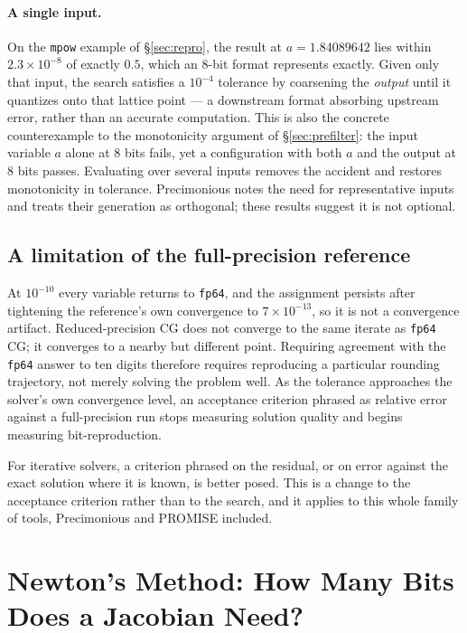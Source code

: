 \documentclass[11pt]{article}
\begin{document}
\paragraph{A single input.} On the \texttt{mpow} example of \S\ref{sec:repro},
the result at $a = 1.84089642$ lies within $2.3 \times 10^{-8}$ of exactly
$0.5$, which an 8-bit format represents exactly. Given only that input, the
search satisfies a $10^{-4}$ tolerance by coarsening the \emph{output} until it
quantizes onto that lattice point --- a downstream format absorbing upstream error,
rather than an accurate computation. This is also the concrete counterexample to
the monotonicity argument of \S\ref{sec:prefilter}: the input variable $a$ alone
at 8 bits fails, yet a configuration with both $a$ and the output at 8 bits
passes. Evaluating over
several inputs removes the accident and restores monotonicity in tolerance.
Precimonious notes the need for representative inputs and treats their generation
as orthogonal; these results suggest it is not optional.

\subsection{A limitation of the full-precision reference}
\label{sec:criterion}

At $10^{-10}$ every variable returns to \texttt{fp64}, and the assignment
persists after
tightening the reference's own convergence to $7 \times 10^{-13}$, so it is not a
convergence artifact. Reduced-precision CG does not converge to the same iterate
as \texttt{fp64} CG; it converges to a nearby but different point. Requiring
agreement with the \texttt{fp64} answer to ten digits therefore requires
reproducing a particular rounding trajectory, not merely solving the problem
well. As the tolerance approaches the solver's own convergence level, an
acceptance criterion phrased as relative error against a full-precision run stops
measuring solution quality and begins measuring bit-reproduction.

For iterative solvers, a criterion phrased on the residual, or on error against
the exact solution where it is known, is better posed. This is a change to the
acceptance criterion rather than to the search, and it applies to this whole
family of tools, Precimonious and PROMISE included.

\section{Newton's Method: How Many Bits Does a Jacobian Need?}
\label{sec:petsc}
\end{document}
